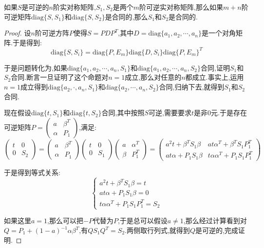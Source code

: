 如果$S$是可逆的$n$阶实对称矩阵,$S_1,S_2$是两个$m$阶可逆实对称矩阵,那么如果$m+n$阶可逆矩阵$\mathrm{diag}\{S,S_1\}$和$\mathrm{diag}\{S,S_2\}$是合同的,那么$S_1$和$S_2$是合同的.
\begin{proof}
	
	设$n$阶可逆方阵$P$使得$S=PDP^{T}$,其中$D=\mathrm{diag}\{a_1,a_2,\cdots,a_n\}$是一个对角矩阵.于是得到:
	$$\mathrm{diag}\{S,S_i\}=\mathrm{diag}\{P,E_m\}\mathrm{diag}\{D,S_i\}\mathrm{diag}\{P,E_m\}^T$$
	
	于是问题转化为,如果$\mathrm{diag}\{a_1,a_2,\cdots,a_n,S_1\}$和$\mathrm{diag}\{a_1,a_2,\cdots,a_n,S_2\}$合同,证明$S_1$和$S_2$合同.断言一旦证明了这个命题对$n=1$成立,那么对任意的$n$都成立.事实上,运用$n=1$成立得到$\mathrm{diag}\{a_2,\cdot,a_n,S_1\}$和$\mathrm{diag}\{a_2,\cdots,a_n,S_2\}$合同,归纳下去,就得到$S_1$和$S_2$合同.
	
	现在假设$\mathrm{diag}\{t,S_1\}$和$\mathrm{diag}\{t,S_2\}$合同,其中按照$S$可逆,需要要求$t$是非0元.于是存在可逆矩阵$P=\left(\begin{array}{cc}
	a&\beta^T\\
	\alpha&P_1\end{array}\right)$,满足:
	$$\left(\begin{array}{cc}
	t&0\\
	0&S_2\end{array}\right)=\left(\begin{array}{cc}
	a&\beta^T\\
	\alpha&P_1\end{array}\right)\left(\begin{array}{cc}
	t&0\\
	0&S_1\end{array}\right)\left(\begin{array}{cc}
	a&\alpha^T\\
	\beta&P_1^T\end{array}\right)=\left(\begin{array}{cc}
	a^2t+\beta^TS_1\beta&at\alpha^T+\beta^TS_1P_1^T\\
	at\alpha+P_1S_1\beta&t\alpha\alpha^T+P_1S_1P_1^T\end{array}\right)$$
	
	于是得到等式关系:
	$$\left\{\begin{array}{c}
	a^2t+\beta^TS_1\beta=t\\
	at\alpha+P_1S_1\beta=0\\
	t\alpha\alpha^T+P_1S_1P_1^T=S_2\end{array}\right.$$
	
	如果这里$a=1$,那么可以把$-P$代替为$P$,于是总可以假设$a\not=1$,那么经过计算看到对$Q=P_1+(1-a)^{-1}\alpha\beta^T$,有$QS_1Q^T=S_2$.两侧取行列式,就得到$Q$是可逆的,完成证明.
	
\end{proof}

